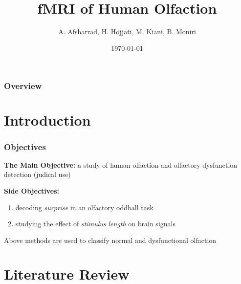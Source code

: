 \documentclass{beamer}
\title[Hmuan Olfaction]{fMRI of Human Olfaction} %
\author{A. Afsharrad, H. Hojjati, M. Kiani, B. Moniri} %
\institute[Sharif University of Technology] %
{
Ambient Intelligence Research Lab (AIR Lab)\\ \textbf{Sharif University of Technology} \\ 
\medskip
}
\date{\today} %
\begin{document}
\begin{frame}
\titlepage %
\end{frame}

\begin{frame}
\frametitle{Overview} %
\tableofcontents %
\end{frame}


\section{Introduction} 

\begin{frame}
\frametitle{Objectives}
\textbf{The Main Objective:}
a study of human olfaction and olfactory dysfunction detection (judical use)
\\
\vspace{0.5cm}

\textbf{Side Objectives:}
\begin{enumerate}
	\item
	decoding \emph{surprise} in an olfactory oddball task
	\item
	studying the effect of \emph{stimulus length} on brain signals
\end{enumerate}
Above methods are used to classify normal and dysfunctional olfaction
\end{frame}


\section{Literature Review} 
\end{document}
